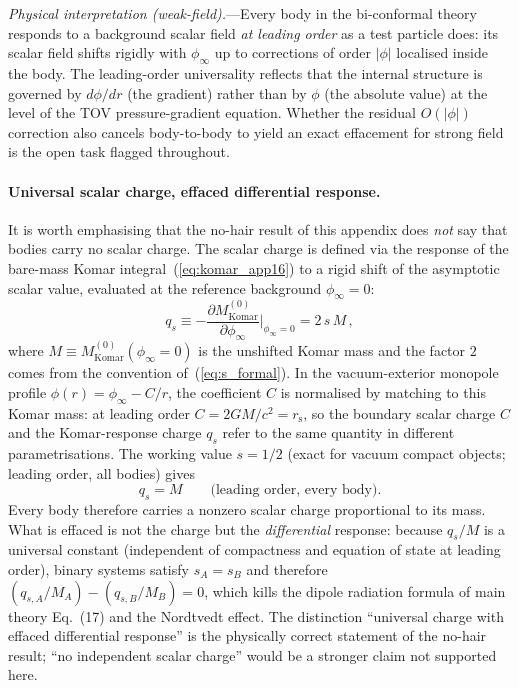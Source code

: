 \documentclass[11pt]{article}
\newcommand{\rs}{r_{\mathrm{s}}}
\begin{document}
\textit{Physical interpretation (weak-field).}---Every
body in the bi-conformal theory responds to a background
scalar field \emph{at leading order} as a test particle
does: its scalar field shifts rigidly with $\phi_\infty$
up to corrections of order $|\phi|$ localised inside the
body.  The leading-order universality reflects that the
internal structure is governed by $d\phi/dr$ (the
gradient) rather than by $\phi$ (the absolute value) at
the level of the TOV pressure-gradient equation.  Whether
the residual $O(|\phi|)$ correction also cancels
body-to-body to yield an exact effacement for strong
field is the open task flagged throughout.

\paragraph{Universal scalar charge, effaced
differential response.}
It is worth emphasising that the no-hair result of this
appendix does \emph{not} say that bodies carry no scalar
charge.  The scalar charge is defined via the response of
the bare-mass Komar integral~(\ref{eq:komar_app16}) to a
rigid shift of the asymptotic scalar value, evaluated at
the reference background $\phi_\infty=0$:
\begin{equation}\label{eq:qs_def}
  q_s \equiv -\frac{\partial M_{\mathrm{Komar}}^{(0)}}
       {\partial\phi_\infty}\bigg|_{\phi_\infty=0}
  = 2\,s\,M\,,
\end{equation}
where $M\equiv M_{\mathrm{Komar}}^{(0)}(\phi_\infty=0)$
is the unshifted Komar mass and the factor $2$ comes
from the convention of~(\ref{eq:s_formal}).  In the
vacuum-exterior monopole profile $\phi(r)=\phi_\infty-C/r$,
the coefficient $C$ is normalised by matching to this
Komar mass: at leading order $C=2GM/c^2=\rs$, so the
boundary scalar charge $C$ and the Komar-response charge
$q_s$ refer to the same quantity in different
parametrisations.  The working value $s=1/2$ (exact for
vacuum compact objects; leading order, all bodies) gives
\begin{equation}\label{eq:qs_universal}
  q_s = M\qquad\text{(leading order, every body)}.
\end{equation}
Every body therefore carries a nonzero scalar charge
proportional to its mass.  What is effaced is not the
charge but the \emph{differential} response: because
$q_s/M$ is a universal constant (independent of
compactness and equation of state at leading order),
binary systems satisfy $s_A = s_B$ and therefore
$(q_{s,A}/M_A) - (q_{s,B}/M_B) = 0$, which kills the
dipole radiation formula of main theory Eq.~(17) and
the Nordtvedt effect.  The distinction
``universal charge with effaced differential response''
is the physically correct statement of the no-hair result;
``no independent scalar charge'' would be a stronger
claim not supported here.
\end{document}
